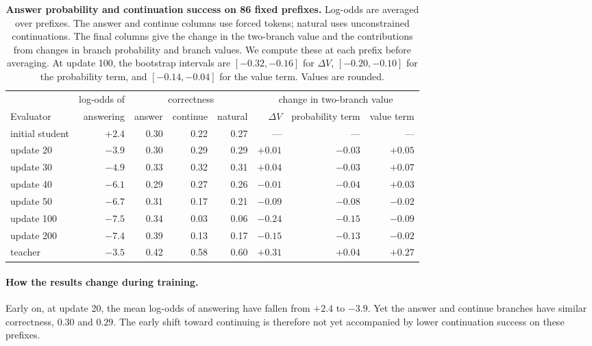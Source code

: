 \begin{table}[htb]
\centering\small\setlength{\tabcolsep}{4pt}
\begin{tabular}{lrrrrrrr}
\toprule
 & log-odds of & \multicolumn{3}{c}{correctness} & \multicolumn{3}{c}{change in two-branch value}\\
\cmidrule(lr){3-5}\cmidrule(lr){6-8}
Evaluator & answering & answer & continue & natural & $\Delta V$ & probability term & value term\\
\midrule
initial student & $+2.4$ & 0.30 & 0.22 & 0.27 & --- & --- & ---\\
update 20  & $-3.9$ & 0.30 & 0.29 & 0.29 & $+0.01$ & $-0.03$ & $+0.05$\\
update 30  & $-4.9$ & 0.33 & 0.32 & 0.31 & $+0.04$ & $-0.03$ & $+0.07$\\
update 40  & $-6.1$ & 0.29 & 0.27 & 0.26 & $-0.01$ & $-0.04$ & $+0.03$\\
update 50  & $-6.7$ & 0.31 & 0.17 & 0.21 & $-0.09$ & $-0.08$ & $-0.02$\\
update 100 & $-7.5$ & 0.34 & 0.03 & 0.06 & $-0.24$ & $-0.15$ & $-0.09$\\
update 200 & $-7.4$ & 0.39 & 0.13 & 0.17 & $-0.15$ & $-0.13$ & $-0.02$\\
teacher    & $-3.5$ & 0.42 & 0.58 & 0.60 & $+0.31$ & $+0.04$ & $+0.27$\\
\bottomrule
\end{tabular}
\caption{\textbf{Answer probability and continuation success on 86 fixed prefixes.} Log-odds are averaged over prefixes. The answer and continue columns use forced tokens; natural uses unconstrained continuations. The final columns give the change in the two-branch value and the contributions from changes in branch probability and branch values. We compute these at each prefix before averaging. At update 100, the bootstrap intervals are $[-0.32,-0.16]$ for $\Delta V$, $[-0.20,-0.10]$ for the probability term, and $[-0.14,-0.04]$ for the value term. Values are rounded.}
\label{tab:steer-probe}
\end{table}

\paragraph{How the results change during training.}
Early on, at update 20, the mean log-odds of answering have fallen from $+2.4$ to $-3.9$. Yet the answer and continue branches have similar correctness, $0.30$ and $0.29$. The early shift toward continuing is therefore not yet accompanied by lower continuation success on these prefixes.

